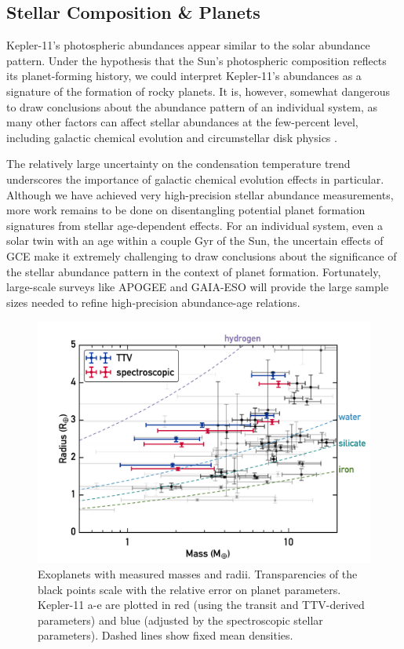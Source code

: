 \documentclass[oneside]{emulateapj}
\begin{document}
\subsection{Stellar Composition \& Planets}

Kepler-11's photospheric abundances appear similar to the solar abundance pattern. Under the \citet{Melendez2009} hypothesis that the Sun's photospheric composition reflects its planet-forming history, we could interpret Kepler-11's abundances as a signature of the formation of rocky planets. It is, however, somewhat dangerous to draw conclusions about the abundance pattern of an individual system, as many other factors can affect stellar abundances at the few-percent level, including galactic chemical evolution and circumstellar disk physics \citep{Gaidos2015}.

The relatively large uncertainty on the condensation temperature trend underscores the importance of galactic chemical evolution effects in particular. Although we have achieved very high-precision stellar abundance measurements, more work remains to be done on disentangling potential planet formation signatures from stellar age-dependent effects. For an individual system, even a solar twin with an age within a couple Gyr of the Sun, the uncertain effects of GCE make it extremely challenging to draw conclusions about the significance of the stellar abundance pattern in the context of planet formation. Fortunately, large-scale surveys like APOGEE and GAIA-ESO will provide the large sample sizes needed to refine high-precision abundance-age relations.

\begin{figure}
\centering
\includegraphics[scale=0.6]{K11_massradius}
\caption{Exoplanets with measured masses and radii. Transparencies of the black points scale with the relative error on planet parameters. Kepler-11 a-e are plotted in red (using the transit and TTV-derived parameters) and blue (adjusted by the spectroscopic stellar parameters). Dashed lines show fixed mean densities.}
\label{fig:mr}
\end{figure}
\end{document}
